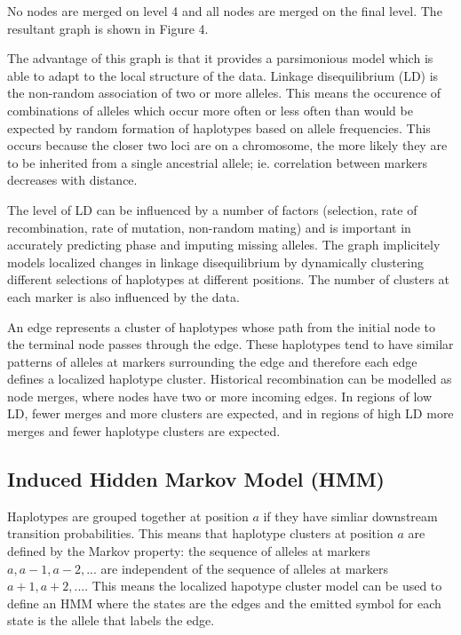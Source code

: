 \documentclass[a4paper,11pt,twoside,abstraction,titlepage]{article}
\begin{document}
\noindent No nodes are merged on level 4 and all nodes are merged on the final level.  The resultant graph is shown in Figure 4.

The advantage of this graph is that it provides a parsimonious model which is able to adapt to the local structure of the data.  Linkage disequilibrium (LD) is the non-random association of two or more alleles.  This means the occurence of combinations of alleles which occur more often or less often than would be expected by random formation of haplotypes based on allele frequencies.  This occurs because the closer two loci are on a chromosome, the more likely they are to be inherited from a single ancestrial allele; ie. correlation between markers decreases with distance.

The level of LD can be influenced by a number of factors (selection, rate of recombination, rate of mutation, non-random mating) and is important in accurately predicting phase and imputing missing alleles.  The graph implicitely models localized changes in linkage disequilibrium by dynamically clustering different selections of haplotypes at different positions.  The number of clusters at each marker is also influenced by the data.

An edge represents a cluster of haplotypes whose path from the initial node to the terminal node passes through the edge.  These haplotypes tend to have similar patterns of alleles at markers surrounding the edge and therefore each edge defines a localized haplotype cluster.  Historical recombination can be modelled as node merges, where nodes have two or more incoming edges.  In regions of low LD, fewer merges and more clusters are expected, and in regions of high LD more merges and fewer haplotype clusters are expected.



\subsection{Induced Hidden Markov Model (HMM)}
Haplotypes are grouped together at position $a$ if they have simliar downstream transition probabilities.  This means that haplotype clusters at position $a$ are defined by the Markov property: the sequence of alleles at markers $a, a-1, a-2, ...$ are independent of the sequence of alleles at markers $a+1, a+2, ...$.  This means the localized hapotype cluster model can be used to define an HMM where the states are the edges and the emitted symbol for each state is the allele that labels the edge.
\end{document}
